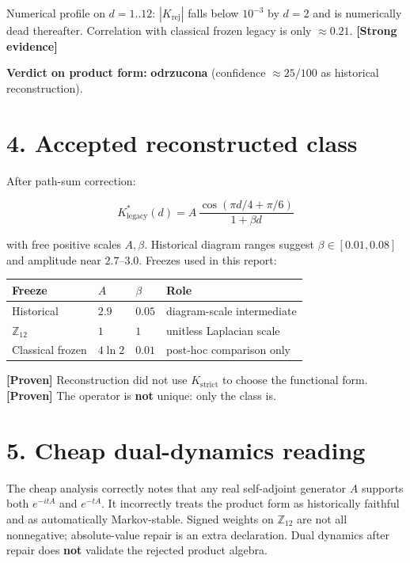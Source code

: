 \documentclass[11pt,a4paper,openany]{report}
\newcommand{\statusProven}{\textcolor{fingreen}{[Proven]}}
\newcommand{\statusStrong}{\textcolor{finblue}{[Strong evidence]}}
\begin{document}
Numerical profile on \(d=1..12\): \(|K_{\mathrm{rej}}|\) falls below \(10^{-3}\) by \(d=2\) and is numerically dead thereafter. Correlation with classical frozen legacy is only \(\approx 0.21\). \textbf{\statusStrong{}}

\textbf{Verdict on product form:} \textbf{odrzucona} (confidence \(\approx 25/100\) as historical reconstruction).

\section{4. Accepted reconstructed class}

After path-sum correction:

\[
\boxed{
K^*_{\mathrm{legacy}}(d)
=
A\,\frac{\cos(\pi d/4+\pi/6)}{1+\beta d}
}
\]

with free positive scales \(A,\beta\). Historical diagram ranges suggest \(\beta\in[0.01,0.08]\) and amplitude near \(2.7\)–\(3.0\). Freezes used in this report:

\begin{center}
\begingroup\small
\setlength{\tabcolsep}{3.5pt}
\renewcommand{\arraystretch}{1.16}
\begin{longtable}{@{}p{}p{}p{}p{}@{}}
\toprule
\textbf{Freeze} & \textbf{\(A\)} & \textbf{\(\beta\)} & \textbf{Role} \\
\midrule
\endhead
Historical & \(2.9\) & \(0.05\) & diagram-scale intermediate \\
\(\mathbb Z_{12}\) & \(1\) & \(1\) & unitless Laplacian scale \\
Classical frozen & \(4\ln 2\) & \(0.01\) & post-hoc comparison only \\
\bottomrule
\end{longtable}
\endgroup
\end{center}

\textbf{\statusProven{}} Reconstruction did not use \(K_{\mathrm{strict}}\) to choose the functional form.\\
\textbf{\statusProven{}} The operator is \textbf{not} unique: only the class is.

\section{5. Cheap dual-dynamics reading}

The cheap analysis correctly notes that any real self-adjoint generator \(A\) supports both \(e^{-itA}\) and \(e^{-tA}\). It incorrectly treats the product form as historically faithful and as automatically Markov-stable. Signed weights on \(\mathbb Z_{12}\) are not all nonnegative; absolute-value repair is an extra declaration. Dual dynamics after repair does \textbf{not} validate the rejected product algebra.
\end{document}
